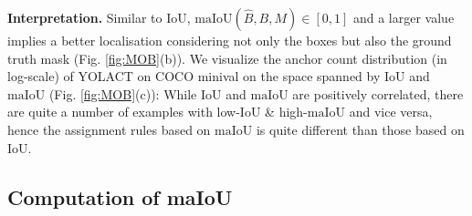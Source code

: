 \documentclass{bmvc2k}
\begin{document}
\noindent \textbf{Interpretation.} Similar to IoU, $\mathrm{maIoU} (\hat{B}, B, M) \in [0,1]$ and a larger value implies a better localisation considering not only the boxes but also the ground truth mask (Fig. \ref{fig:MOB}(b)). We visualize the anchor count  distribution (in log-scale) of YOLACT on COCO minival on the space spanned by $\mathrm{IoU}$ and $\mathrm{maIoU}$ (Fig. \ref{fig:MOB}(c)): While $\mathrm{IoU}$ and $\mathrm{maIoU}$ are positively correlated, there are quite a number of examples with low-$\mathrm{IoU}$ \& high-$\mathrm{maIoU}$ and vice versa, hence the assignment rules based on $\mathrm{maIoU}$ is quite different than those based on $\mathrm{IoU}$.  





\subsection{Computation of maIoU}
\label{subsec:Algorithm}
\end{document}
